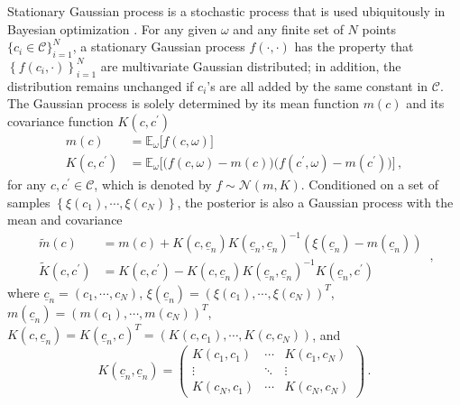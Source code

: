 Stationary Gaussian process is a stochastic process that is used ubiquitously in Bayesian optimization
\cite{GP book}.
For any given $\omega$ and any finite set of $N$ points $\{c_i\in \mathcal{C}\}_{i=1}^N$, 
a stationary Gaussian process $f(\cdot, \cdot)$ 
has the property that $\left\{ f(c_i, \cdot) \right\}_{i=1}^N$ 
are multivariate Gaussian distributed; in addition, the distribution remains unchanged if 
$c_i$'s are all added by the same constant in $\mathcal{C}$.
The Gaussian process is solely determined by its mean 
function $m(c)$ and its covariance function $K(c,c^\prime)$ \cite{GP book}
\begin{equation}\begin{split}
    m(c) &= \mathbb{E}_\omega\big[f(c, \omega)\big]\\
    K(c, c^\prime) &= \mathbb{E}_\omega\Big[\big(f(c,\omega)-m(c)\big)\big(f(c^\prime,\omega)
                    -m(c^\prime)\big)\Big]\,,
\end{split}\end{equation}
for any $c, c^\prime \in \mathcal{C}$, which is denoted by $f \sim\mathcal{N}(m, K)$.
Conditioned on a set of samples $\left\{\xi(c_1), \cdots, \xi(c_N)\right\}$, 
the posterior is also a Gaussian process with the mean and covariance \cite{GP book}
\begin{equation}\begin{split}
    \tilde{m}(c) & 
    = m(c) + K(c,\underline{c}_n)K(\underline{c}_n,\underline{c}_n)^{-1}
    \left(\xi(\underline{c}_n) - m(\underline{c}_n)\right)\\
    \tilde{K}(c, c^\prime)&=
    K(c,c^\prime) - K(c,\underline{c}_n) K(\underline{c}_n, \underline{c}_n)^{-1} K(\underline{c}_n,c^\prime)
\end{split}\,,
\label{eqn: posterior formulation}
\end{equation}
where $\underline{c}_n = \left( c_1, \cdots, c_N\right)$,
$\xi(\underline{c}_n) = \left( \xi(c_1), \cdots, \xi(c_N)\right)^T$, 
$m(\underline{c}_n) = \left( m(c_1), \cdots, m(c_N)\right)^T$,
$K(c, \underline{c}_n) = K(\underline{c}_n, c)^T = \left(
K(c, c_1), \cdots, K(c, c_N)\right)$, and
\begin{equation*}
    K(\underline{c}_n, \underline{c}_n) = \begin{pmatrix} 
        K(c_1, c_1) & \cdots & K(c_1, c_N)\\
        \vdots      & \ddots & \vdots\\
        K(c_N, c_1) & \cdots & K(c_N, c_N)
    \end{pmatrix}\,.
\end{equation*}
